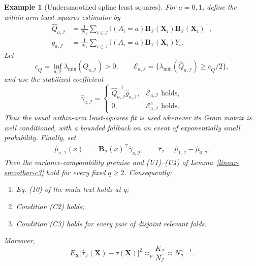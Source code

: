 \documentclass[11pt]{article}
\theoremstyle{referenceplain}
\theoremstyle{referencedefinition}
\newtheorem{example}{Example}
\theoremstyle{referenceremark}
\begin{document}
\begin{example}[Undersmoothed spline least squares]
For $a=0,1$, define the within-arm least-squares estimator by
\begin{align*}
\widehat Q_{a,\mathcal I}
&=\frac1{N_{\mathcal I}}
\sum_{i\in\mathcal I}\mathbb I(A_i=a)
\mathbf B_{\mathcal I}(\mathbf X_i)
\mathbf B_{\mathcal I}(\mathbf X_i)^\top,\\
\widehat g_{a,\mathcal I}
&=\frac1{N_{\mathcal I}}
\sum_{i\in\mathcal I}\mathbb I(A_i=a)
\mathbf B_{\mathcal I}(\mathbf X_i)Y_i.
\end{align*}
Let
\[
\underline c_Q=\inf_{a,\mathcal I}\lambda_{\min}(Q_{a,\mathcal I})>0,
\qquad
\mathcal E_{a,\mathcal I}
=\{\lambda_{\min}(\widehat Q_{a,\mathcal I})\ge\underline c_Q/2\},
\]
and use the stabilized coefficient
\[
\widehat\gamma_{a,\mathcal I}
=
\begin{cases}
\widehat Q_{a,\mathcal I}^{-1}\widehat g_{a,\mathcal I},
&\mathcal E_{a,\mathcal I}\text{ holds},\\[2mm]
0,&\mathcal E_{a,\mathcal I}^{c}\text{ holds}.
\end{cases}
\]
Thus the usual within-arm least-squares fit is used whenever its Gram matrix
is well conditioned, with a bounded fallback on an event of exponentially
small probability. Finally, set
\begin{align*}
\widehat\mu_{a,\mathcal I}(x)
&=\mathbf B_{\mathcal I}(x)^\top\widehat\gamma_{a,\mathcal I},
\qquad
\widehat\tau_{\mathcal I}
=\widehat\mu_{1,\mathcal I}-\widehat\mu_{0,\mathcal I}.
\end{align*}
Then the variance-comparability premise and (U1)--(U4) of
Lemma~\ref{linear-smoother-c3} hold for every fixed $q\ge2$. Consequently:
\begin{enumerate}
\item[\textup{(a)}] Eq. (10) of the main text holds at $q$;
\item[\textup{(b)}] Condition (C2) holds;
\item[\textup{(c)}] Condition (C3) holds for every pair of disjoint relevant folds.
\end{enumerate}
Moreover,
\[
E_{\mathbf X}|\widehat\tau_{\mathcal I}(\mathbf X)-\tau(\mathbf X)|^2
\asymp_p \frac{K_{\mathcal I}}{N_{\mathcal I}}
\asymp N_{\mathcal I}^{\kappa-1}.
\]
\end{example}
\end{document}
